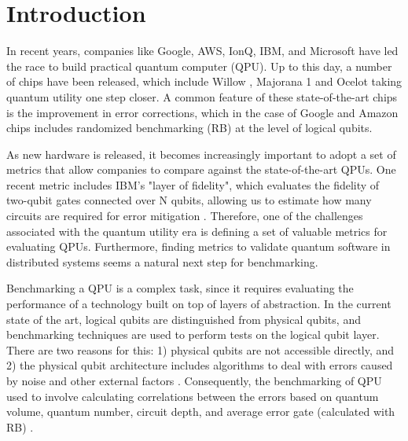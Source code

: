 \section*{Introduction}


In recent years, companies like Google, AWS, IonQ, IBM, and Microsoft have led the race to build practical quantum computer (QPU). Up to this day, a number of chips have been released, which include Willow \cite{acharyaQuantumErrorCorrection2025_2025}, Majorana 1 \cite{aasenRoadmapFaultTolerant2025_2025} and Ocelot \cite{puttermanHardwareefficientQuantumErrora_2025} taking quantum utility one step closer. A common feature of these state-of-the-art chips is the improvement in error corrections, which in the case of Google and Amazon chips includes randomized benchmarking (RB) at the level of logical qubits.


As new hardware is released, it becomes increasingly important to adopt a set of metrics that allow companies to compare against the state-of-the-art QPUs. One recent metric includes IBM's "layer of fidelity", which evaluates the fidelity of two-qubit gates connected over N qubits, allowing us to estimate how many circuits are required for error mitigation \cite{mckayBenchmarkingQuantumProcessor2023}. Therefore, one of the challenges associated with the quantum utility era is defining a set of valuable metrics for evaluating QPUs. Furthermore, finding metrics to validate quantum software in distributed systems seems a natural next step for benchmarking.


Benchmarking a QPU is a complex task, since it requires evaluating the performance of a technology built on top of layers of abstraction. In the current state of the art, logical qubits are distinguished from physical qubits, and benchmarking techniques are used to perform tests on the logical qubit layer. There are two reasons for this: 1) physical qubits are not accessible directly, and 2) the physical qubit architecture includes algorithms to deal with errors caused by noise and other external factors \cite{campbellRoadsFaulttolerantUniversal2017_2017, tomitaLowdistanceSurfaceCodes_2014}. Consequently, the benchmarking of QPU used to involve calculating correlations between the errors based on quantum volume, quantum number, circuit depth, and average error gate (calculated with RB) \cite{proctorBenchmarkingQuantumComputers2025_2025}.

